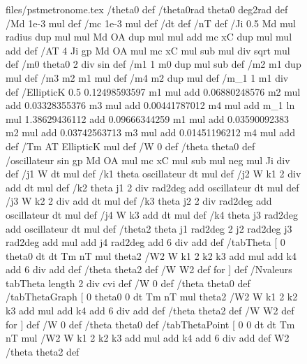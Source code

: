 \documentclass[a4paper]{article}
\begin{document}
\begin{figure}[hb]
\begin{VerbatimOut}{files/pstmetronome.tex}
{{ /theta0 \psk@oscmetronomethetai def %
 /theta0rad theta0 deg2rad def %
 /Md \psk@oscmetronometM 1e-3 mul def %
 /mc \psk@oscmetronometm 1e-3 mul def %
 /dt \psk@oscmetronomedt def
 /nT \psk@oscmetronomenT def
 /Ji {0.5 Md mul radius dup mul mul Md OA dup mul mul add mc xC dup mul mul add} def
 /AT {4
      Ji
      gp Md OA mul mc xC mul sub mul
      div
      sqrt
      mul} def
        /m0 theta0 2 div sin def
        /m1 {1 m0 dup mul sub} def
        /m2 {m1 dup mul} def
        /m3 {m2 m1 mul} def
        /m4 {m2 dup mul} def
        /m_1 {1 m1 div} def
     /EllipticK {
        0.5
        0.12498593597 m1 mul add
        0.06880248576 m2 mul add
        0.03328355376 m3 mul add
        0.00441787012 m4 mul add
        m_1 ln mul
        1.38629436112 add
        0.09666344259 m1 mul add
        0.03590092383 m2 mul add
        0.03742563713 m3 mul add
        0.01451196212 m4 mul add
      } def
/Tm {AT EllipticK mul} def
    /W 0 def %
    /theta theta0 def
    /oscillateur {sin gp Md OA mul mc xC mul sub mul neg mul Ji div} def
    /j1 {W dt mul} def
    /k1 {theta oscillateur dt mul} def
    /j2 {W k1 2 div add dt mul} def
    /k2 {theta j1 2 div rad2deg add oscillateur dt mul} def
    /j3 {W k2 2 div add dt mul} def
    /k3 {theta j2 2 div rad2deg add oscillateur dt mul} def
    /j4 {W k3 add dt mul} def
    /k4 {theta j3 rad2deg add oscillateur dt mul} def
    /theta2 {theta j1 rad2deg 2 j2 rad2deg j3 rad2deg add mul add j4 rad2deg add 6 div add} def
/tabTheta [ %
    0 theta0 %
dt dt Tm nT mul{ %
    theta2 %
    /W2 W k1 2 k2 k3 add mul add k4 add 6 div add def
    /theta theta2 def
    /W W2 def
    }  for
        ] def
/Nvaleurs tabTheta length 2 div cvi def
    /W 0 def %
    /theta theta0 def
/tabThetaGraph [ %
    0 theta0  %
0 dt Tm nT mul { %
    theta2 %
    /W2 W k1 2 k2 k3 add mul add k4 add 6 div add def
    /theta theta2 def
    /W W2 def
    }  for
        ] def
    /W 0 def %
    /theta theta0 def
/tabThetaPoint [ %
    0 0  %
dt dt Tm nT mul { %
    /W2 W k1 2 k2 k3 add mul add k4 add 6 div add def
    W2
    /theta theta2 def
}}}
\end{VerbatimOut}
\end{figure}
\end{document}

